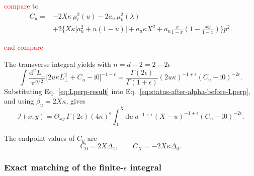 \documentclass[11pt]{article}
\newcommand{\dd}{\mathrm d}
\newcommand{\ii}{\mathrm i}
\newcommand{\eps}{\epsilon}
\begin{document}
\textcolor{red}{compare to }
\begin{align}
C_u={}&
-2X\kappa\,\mu_l^2(u)-2a_u\,\mu_k^2(\lambda)
\nonumber\\
&+2\Biggl\{
X\kappa\bigl[a_u^2+u(1-u)\bigr]
+a_u\kappa X^2
+a_u\frac{y}{1-x}\left(1-\frac{xy}{1-x}\right)
\Biggr\}p^2.
\label{eq:C-u-def}
\end{align}

\textcolor{red}{end compare}

The transverse integral yields with $n=d-2=2-2\eps$
\begin{equation}
\int\frac{\dd^n L_\perp}{\pi^{n/2}}
\bigl[2u\kappa L_\perp^2+C_u-\ii0\bigr]^{-1-\eps}
=
\frac{\Gamma(2\eps)}{\Gamma(1+\eps)}
(2u\kappa)^{-1+\eps}(C_u-\ii0)^{-2\eps}.
\label{eq:Lperp-result}
\end{equation}
Substituting Eq.~\eqref{eq:Lperp-result} into Eq.~\eqref{eq:status-after-alpha-before-Lperp}, and using $\beta_u=2X\kappa$, gives
\begin{equation}
\boxed{
\mathcal I(x,y)
=
\Theta_{xy}\,\Gamma(2\eps)(4\kappa)^\eps
\int_0^X\dd u\,
 u^{-1+\eps}(X-u)^{-1+\eps}
(C_u-\ii0)^{-2\eps}.
}
\label{eq:method1-u-representation}
\end{equation}


The endpoint values of $C_u$ are
\begin{equation}
C_0=2X\Delta_1,
\qquad
C_X=-2X\kappa\Delta_0.
\label{eq:C-endpoints}
\end{equation}


\subsubsection{Exact matching of the finite-$\epsilon$ integral}
\end{document}

